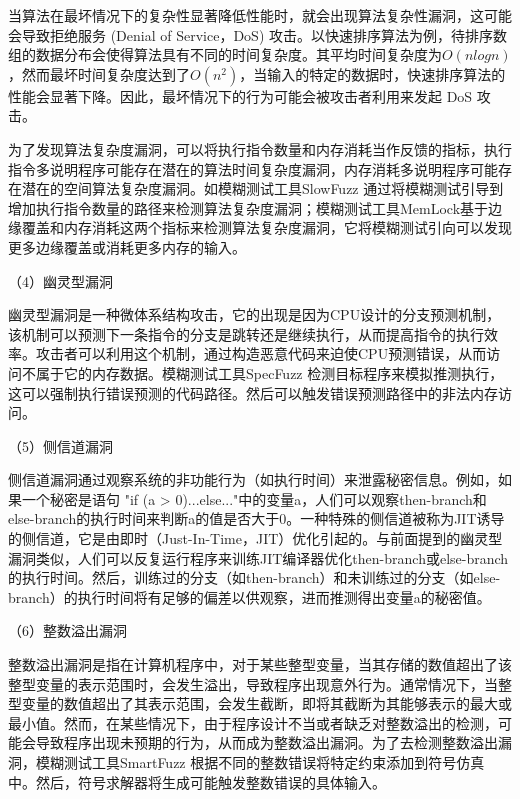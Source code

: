 \documentclass[master]{thesis-uestc}
\begin{document}
当算法在最坏情况下的复杂性显著降低性能时，就会出现算法复杂性漏洞，这可能会导致拒绝服务 (Denial of Service，DoS) 攻击。以快速排序算法为例，待排序数组的数据分布会使得算法具有不同的时间复杂度。其平均时间复杂度为$O(nlogn)$，然而最坏时间复杂度达到了$O(n^2)$，当输入的特定的数据时，快速排序算法的性能会显著下降。因此，最坏情况下的行为可能会被攻击者利用来发起 DoS 攻击。

为了发现算法复杂度漏洞，可以将执行指令数量和内存消耗当作反馈的指标，执行指令多说明程序可能存在潜在的算法时间复杂度漏洞，内存消耗多说明程序可能存在潜在的空间算法复杂度漏洞。如模糊测试工具SlowFuzz 通过将模糊测试引导到增加执行指令数量的路径来检测算法复杂度漏洞；模糊测试工具MemLock基于边缘覆盖和内存消耗这两个指标来检测算法复杂度漏洞，它将模糊测试引向可以发现更多边缘覆盖或消耗更多内存的输入。

（4）幽灵型漏洞

幽灵型漏洞是一种微体系结构攻击，它的出现是因为CPU设计的分支预测机制，该机制可以预测下一条指令的分支是跳转还是继续执行，从而提高指令的执行效率。攻击者可以利用这个机制，通过构造恶意代码来迫使CPU预测错误，从而访问不属于它的内存数据。模糊测试工具SpecFuzz 检测目标程序来模拟推测执行，这可以强制执行错误预测的代码路径。然后可以触发错误预测路径中的非法内存访问。


（5）侧信道漏洞

侧信道漏洞通过观察系统的非功能行为（如执行时间）来泄露秘密信息。例如，如果一个秘密是语句 "if (a > 0){...}else{...}"中的变量a，人们可以观察then-branch和else-branch的执行时间来判断a的值是否大于0。一种特殊的侧信道被称为JIT诱导的侧信道，它是由即时（Just-In-Time，JIT）优化引起的。与前面提到的幽灵型漏洞类似，人们可以反复运行程序来训练JIT编译器优化then-branch或else-branch的执行时间。然后，训练过的分支（如then-branch）和未训练过的分支（如else-branch）的执行时间将有足够的偏差以供观察，进而推测得出变量a的秘密值。

（6）整数溢出漏洞

整数溢出漏洞是指在计算机程序中，对于某些整型变量，当其存储的数值超出了该整型变量的表示范围时，会发生溢出，导致程序出现意外行为。通常情况下，当整型变量的数值超出了其表示范围，会发生截断，即将其截断为其能够表示的最大或最小值。然而，在某些情况下，由于程序设计不当或者缺乏对整数溢出的检测，可能会导致程序出现未预期的行为，从而成为整数溢出漏洞。为了去检测整数溢出漏洞，模糊测试工具SmartFuzz 根据不同的整数错误将特定约束添加到符号仿真中。然后，符号求解器将生成可能触发整数错误的具体输入。
\end{document}
